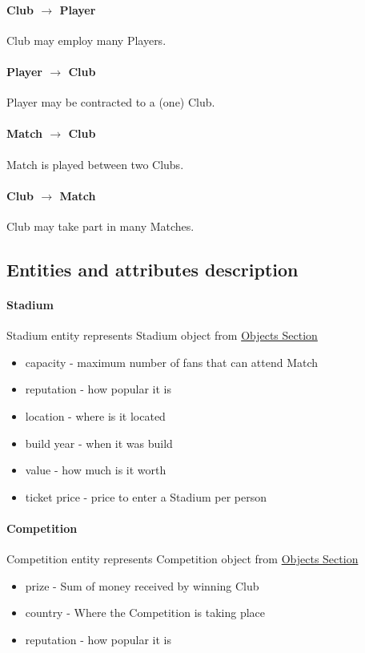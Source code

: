 \documentclass{report}
\begin{document}
\paragraph{Club $\rightarrow$ Player}
Club may employ many Players.

\paragraph{Player $\rightarrow$ Club}
Player may be contracted to a (one) Club.

\paragraph{Match $\rightarrow$ Club}
Match is played between two Clubs.

\paragraph{Club $\rightarrow$ Match}
Club may take part in many Matches.


\subsection{Entities and attributes description}
\paragraph{Stadium}
Stadium entity represents Stadium object from \hyperref[Objects Section]{Objects Section}
\begin{itemize}
    \item capacity - maximum number of fans that can attend Match
    \item reputation - how popular it is
    \item location - where is it located
    \item build year - when it was build
    \item value - how much is it worth
    \item ticket price - price to enter a Stadium per person
\end{itemize}


\paragraph{Competition}
Competition entity represents Competition object from \hyperref[Objects Section]{Objects Section}
\begin{itemize}
    \item prize - Sum of money received by winning Club
    \item country - Where the Competition is taking place
    \item reputation - how popular it is
\end{itemize}
\end{document}
